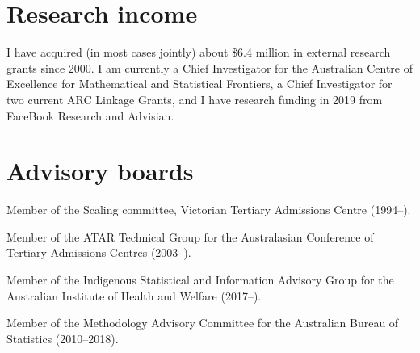 \documentclass[a4paper,10pt]{article}
\begin{document}
\section{Research income}

I have acquired (in most cases jointly) about \$6.4 million in external research grants since 2000. I am currently a Chief Investigator for the Australian Centre of Excellence for Mathematical and Statistical Frontiers,  a Chief Investigator for two current ARC Linkage Grants, and I have research funding in 2019 from FaceBook Research and Advisian.

\section{Advisory boards}

\begin{compactitem}
\item
  Member of the Scaling committee, Victorian Tertiary Admissions Centre (1994--). %
\item
  Member of the ATAR Technical Group for the Australasian Conference of Tertiary Admissions Centres (2003--).
\item
  Member of the Indigenous Statistical and Information Advisory Group for the Australian Institute of Health and Welfare (2017--).
\item
  Member of the Methodology Advisory Committee for the Australian Bureau of Statistics (2010--2018).
\end{compactitem}

\enlargethispage*{0.9cm}

\setlength{\bibitemsep}{1.8pt}

\end{document}
